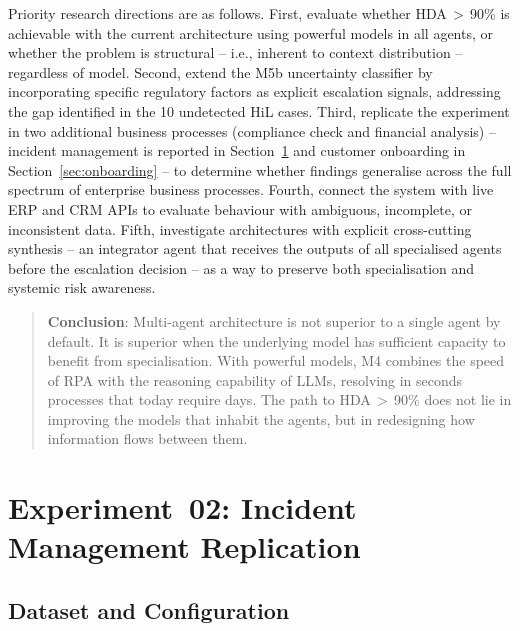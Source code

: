 \documentclass[preprint,12pt,authoryear]{elsarticle}
\begin{document}
Priority research directions are as follows.
First, evaluate whether HDA\,$>$\,90\% is achievable with the current
architecture using powerful models in all agents, or whether the problem is
structural -- i.e., inherent to context distribution -- regardless of model.
Second, extend the M5b uncertainty classifier by incorporating specific
regulatory factors as explicit escalation signals, addressing the gap identified
in the 10 undetected HiL cases.
Third, replicate the experiment in two additional business processes (compliance
check and financial analysis) -- incident management is reported in
Section~\ref{sec:incident} and customer onboarding in Section~\ref{sec:onboarding}
-- to determine whether findings generalise across the full spectrum of enterprise
business processes.
Fourth, connect the system with live ERP and CRM APIs to evaluate behaviour
with ambiguous, incomplete, or inconsistent data.
Fifth, investigate architectures with explicit cross-cutting synthesis -- an
integrator agent that receives the outputs of all specialised agents before the
escalation decision -- as a way to preserve both specialisation and systemic
risk awareness.

\begin{quote}
\textbf{Conclusion}: Multi-agent architecture is not superior to a single agent
by default.
It is superior when the underlying model has sufficient capacity to benefit from
specialisation.
With powerful models, M4 combines the speed of RPA with the reasoning capability
of LLMs, resolving in seconds processes that today require days.
The path to HDA\,$>$\,90\% does not lie in improving the models that inhabit the
agents, but in redesigning how information flows between them.
\end{quote}


\section{Experiment~02: Incident Management Replication}
\label{sec:incident}

\subsection{Dataset and Configuration}
\end{document}
